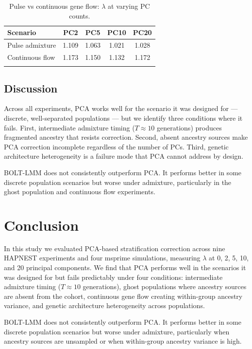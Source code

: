\documentclass[unnumsec,webpdf,contemporary,large]{oup-authoring-template}
\theoremstyle{thmstyleone}
\theoremstyle{thmstyletwo}
\theoremstyle{thmstylethree}
\begin{document}
\begin{table}[!t]
\caption{Pulse vs continuous gene flow: $\lambda$ at varying PC counts.\label{tab:flow}}
\begin{tabular*}{\columnwidth}{@{\extracolsep\fill}lcccc@{\extracolsep\fill}}
\toprule
Scenario & PC2 & PC5 & PC10 & PC20 \\
\midrule
Pulse admixture & 1.109 & 1.063 & 1.021 & 1.028 \\
Continuous flow & 1.173 & 1.150 & 1.132 & 1.172 \\
\botrule
\end{tabular*}
\end{table}

\subsection{Discussion}

Across all experiments, PCA works well for the scenario it was designed for — discrete, well-separated populations — but we identify three conditions where it fails. First, intermediate admixture timing ($T \approx 10$ generations) produces fragmented ancestry that resists correction. Second, absent ancestry sources make PCA correction incomplete regardless of the number of PCs. Third, genetic architecture heterogeneity is a failure mode that PCA cannot address by design.

BOLT-LMM does not consistently outperform PCA. It performs better in some discrete population scenarios but worse under admixture, particularly in the ghost population and continuous flow experiments.

\section{Conclusion}

In this study we evaluated PCA-based stratification correction across nine HAPNEST experiments and four msprime simulations, measuring $\lambda$ at 0, 2, 5, 10, and 20 principal components. We find that PCA performs well in the scenarios it was designed for but fails predictably under four conditions: intermediate admixture timing ($T \approx 10$ generations), ghost populations where ancestry sources are absent from the cohort, continuous gene flow creating within-group ancestry variance, and genetic architecture heterogeneity across populations.

BOLT-LMM does not consistently outperform PCA. It performs better in some discrete population scenarios but worse under admixture, particularly when ancestry sources are unsampled or when within-group ancestry variance is high.
\end{document}
